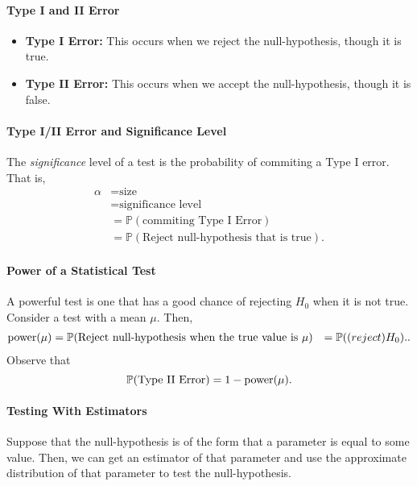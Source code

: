 \paragraph{Type I and II Error}
\begin{itemize}
  \item \textbf{Type I Error:} This occurs when we reject the null-hypothesis, though it is true.
  \item \textbf{Type II Error:} This occurs when we accept the null-hypothesis, though it is false.
\end{itemize}

\paragraph{Type I/II Error and Significance Level}
The \textit{significance} level of a test is the probability of commiting a 
Type I error. That is,
\begin{align*}
  \alpha &= \text{size} \\
         &= \text{significance level} \\
         &= \mathbb{P}(\text{commiting Type I Error}) \\
         &= \mathbb{P}(\text{Reject null-hypothesis that is true})
.\end{align*}


\paragraph{Power of a Statistical Test}
A powerful test is one that has a good chance of rejecting \(H_0\) when it is not  true.
Consider a test with a mean \(\mu\). Then,
\begin{align*}
  \mathrm{power}(\mu) &= \mathbb{P}(\text{Reject null-hypothesis when the true value is } \mu)
              &= \mathbb{P}(\text(reject ) H_0).
.\end{align*}
Observe that \[
  \mathbb{P}(\text{Type II Error}) = 1 - \mathrm{power}(\mu)
.\] 

\paragraph{Testing With Estimators}
Suppose that the null-hypothesis is of the form that a parameter is equal to some value.
Then, we can get an estimator of that parameter and use the approximate distribution of that
parameter to test the null-hypothesis.


